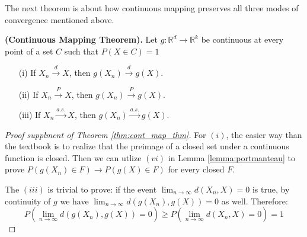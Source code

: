 \documentclass{article}
\begin{document}
The next theorem is about how continuous mapping preserves all three modes of convergence mentioned above.

\begin{theorem}
    \label{thm:cont_map_thm}
    \textbf{(Continuous Mapping Theorem).} Let $g: \mathbb{R}^d \to \mathbb{R}^k$ be continuous at every point of a set \( C \) such that \( P(X \in C) = 1 \)
    \begin{enumerate}
        \item[(i)] If $X_n \xrightarrow{d} X$, then $g(X_n) \xrightarrow{d} g(X)$.
        \item[(ii)] If $X_n \xrightarrow{P} X$, then $g(X_n) \xrightarrow{P} g(X)$.
        \item[(iii)] If $X_n \xrightarrow{a.s.} X$, then $g(X_n) \xrightarrow{a.s.} g(X)$.
    \end{enumerate}
\end{theorem}

\begin{proof}[Proof supplment of Theorem \ref*{thm:cont_map_thm}]
    For $(i)$, the easier way than the textbook is to realize that the preimage of a closed set under a continuous function is closed. Then we can utlize $(vi)$ in Lemma \ref{lemma:portmanteau} to prove $P(g(X_n) \in F) \to P(g(X) \in F)$ for every closed $F$.

    The $(iii)$ is trivial to prove: if the event $\lim_{n\to\infty}d(X_n, X) = 0$ is true, by continuity of $g$ we have $\lim_{n\to\infty}d(g(X_n), g(X)) = 0$ as well. Therefore:
    \begin{equation}
        P\left(\lim_{n\to\infty}d(g(X_n), g(X)) = 0\right) \geq P\left(\lim_{n\to\infty}d(X_n, X) = 0\right) = 1
    \end{equation}
\end{proof}
\end{document}
